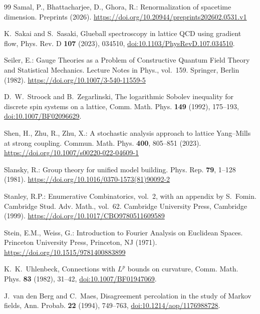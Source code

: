 \documentclass[11pt]{amsart}
\theoremstyle{definition}
\theoremstyle{remark}
\numberwithin{equation}{section}
\begin{document}
\begin{thebibliography}{99}
Samal, P., Bhattacharjee, D., Ghora, R.: Renormalization of spacetime dimension. Preprints (2026). \href{https://doi.org/10.20944/preprints202602.0531.v1}{https://doi.org/10.20944/preprints202602.0531.v1}

K.~Sakai and S.~Sasaki, Glueball spectroscopy in lattice QCD using gradient
flow, Phys. Rev. D \textbf{107} (2023), 034510,
\href{https://doi.org/10.1103/PhysRevD.107.034510}{doi:10.1103/PhysRevD.107.034510}.

Seiler, E.: Gauge Theories as a Problem of Constructive Quantum Field
Theory and Statistical Mechanics. Lecture Notes in Phys., vol.~159.
Springer, Berlin (1982).
\href{https://doi.org/10.1007/3-540-11559-5}{https://doi.org/10.1007/3-540-11559-5}

D.~W.~Stroock and B.~Zegarlinski, The logarithmic Sobolev inequality for
discrete spin systems on a lattice, Comm. Math. Phys. \textbf{149} (1992),
175--193, \href{https://doi.org/10.1007/BF02096629}{doi:10.1007/BF02096629}.

Shen, H., Zhu, R., Zhu, X.: A stochastic analysis approach to lattice
Yang--Mills at strong coupling. Commun. Math. Phys. \textbf{400}, 805--851
(2023).
\href{https://doi.org/10.1007/s00220-022-04609-1}{https://doi.org/10.1007/s00220-022-04609-1}

Slansky, R.: Group theory for unified model building. Phys. Rep.
\textbf{79}, 1--128 (1981).
\href{https://doi.org/10.1016/0370-1573(81)90092-2}{https://doi.org/10.1016/0370-1573(81)90092-2}

Stanley, R.P.: Enumerative Combinatorics, vol.~2, with an appendix by
S.~Fomin. Cambridge Stud. Adv.
Math., vol.~62. Cambridge University Press, Cambridge (1999).
\href{https://doi.org/10.1017/CBO9780511609589}{https://doi.org/10.1017/CBO9780511609589}

Stein, E.M., Weiss, G.: Introduction to Fourier Analysis on Euclidean Spaces. Princeton University Press, Princeton, NJ (1971). \href{https://doi.org/10.1515/9781400883899}{https://doi.org/10.1515/9781400883899}

K.~K.~Uhlenbeck, Connections with $L^p$ bounds on curvature, Comm. Math.
Phys. \textbf{83} (1982), 31--42,
\href{https://doi.org/10.1007/BF01947069}{doi:10.1007/BF01947069}.

J.~van den Berg and C.~Maes, Disagreement percolation in the study of
Markov fields, Ann. Probab. \textbf{22} (1994), 749--763,
\href{https://doi.org/10.1214/aop/1176988728}{doi:10.1214/aop/1176988728}.


\end{thebibliography}
\end{document}
